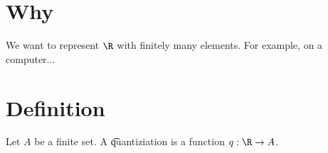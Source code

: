 

\section*{Why}

We want to represent $\R $ with finitely many elements. For example, on a computer...

\section*{Definition}

Let $A$ be a finite set.
A \t{quantiziation} is a function $q: \R  \to A$.

\blankpage